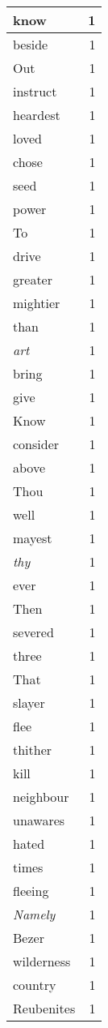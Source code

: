 \begin{center}
\begin{longtable}{l|r}
know & 1 \\ \hline
beside & 1 \\ \hline
Out & 1 \\ \hline
instruct & 1 \\ \hline
heardest & 1 \\ \hline
loved & 1 \\ \hline
chose & 1 \\ \hline
seed & 1 \\ \hline
power & 1 \\ \hline
To & 1 \\ \hline
drive & 1 \\ \hline
greater & 1 \\ \hline
mightier & 1 \\ \hline
than & 1 \\ \hline
\emph{art} & 1 \\ \hline
bring & 1 \\ \hline
give & 1 \\ \hline
Know & 1 \\ \hline
consider & 1 \\ \hline
above & 1 \\ \hline
Thou & 1 \\ \hline
well & 1 \\ \hline
mayest & 1 \\ \hline
\emph{thy} & 1 \\ \hline
ever & 1 \\ \hline
Then & 1 \\ \hline
severed & 1 \\ \hline
three & 1 \\ \hline
That & 1 \\ \hline
slayer & 1 \\ \hline
flee & 1 \\ \hline
thither & 1 \\ \hline
kill & 1 \\ \hline
neighbour & 1 \\ \hline
unawares & 1 \\ \hline
hated & 1 \\ \hline
times & 1 \\ \hline
fleeing & 1 \\ \hline
\emph{Namely} & 1 \\ \hline
Bezer & 1 \\ \hline
wilderness & 1 \\ \hline
country & 1 \\ \hline
Reubenites & 1 \\ \hline

\end{longtable}
\end{center}
